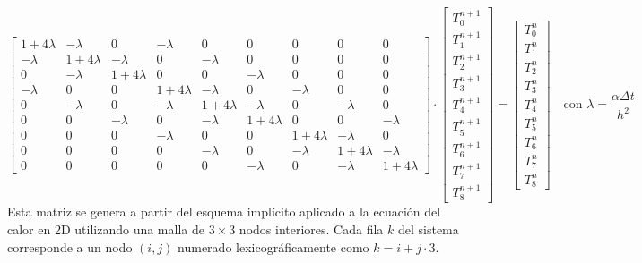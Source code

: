 \documentclass{article}
\begin{document}
$$
\begin{bmatrix}
1+4\lambda & -\lambda & 0         & -\lambda & 0         & 0         & 0         & 0         & 0 \\
-\lambda   & 1+4\lambda & -\lambda & 0         & -\lambda & 0         & 0         & 0         & 0 \\
0         & -\lambda & 1+4\lambda & 0         & 0         & -\lambda & 0         & 0         & 0 \\
-\lambda   & 0         & 0         & 1+4\lambda & -\lambda & 0         & -\lambda & 0         & 0 \\
0         & -\lambda & 0         & -\lambda & 1+4\lambda & -\lambda & 0         & -\lambda & 0 \\
0         & 0         & -\lambda & 0         & -\lambda & 1+4\lambda & 0         & 0         & -\lambda \\
0         & 0         & 0         & -\lambda & 0         & 0         & 1+4\lambda & -\lambda & 0 \\
0         & 0         & 0         & 0         & -\lambda & 0         & -\lambda & 1+4\lambda & -\lambda \\
0         & 0         & 0         & 0         & 0         & -\lambda & 0         & -\lambda & 1+4\lambda
\end{bmatrix}
\cdot
\begin{bmatrix}
T_0^{n+1} \\
T_1^{n+1} \\
T_2^{n+1} \\
T_3^{n+1} \\
T_4^{n+1} \\
T_5^{n+1} \\
T_6^{n+1} \\
T_7^{n+1} \\
T_8^{n+1}
\end{bmatrix}
=
\begin{bmatrix}
T_0^n \\
T_1^n \\
T_2^n \\
T_3^n \\
T_4^n \\
T_5^n \\
T_6^n \\
T_7^n \\
T_8^n
\end{bmatrix}
\quad \text{con } \lambda = \frac{\alpha \Delta t}{h^2}
$$
Esta matriz se genera a partir del esquema implícito aplicado a la ecuación del calor en 2D utilizando una malla de $3 \times 3$ nodos interiores. Cada fila $k$ del sistema corresponde a un nodo $(i,j)$ numerado lexicográficamente como $k = i + j \cdot 3$.
\end{document}
